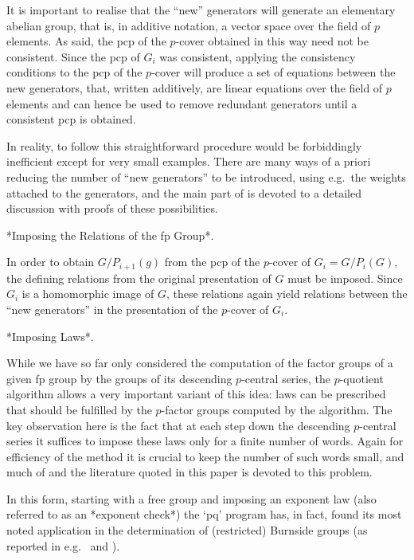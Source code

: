 It is important  to realise  that the  ``new'' generators
will  generate  an elementary  abelian  group,  that  is, in  additive
notation, a vector space over the field of $p$ elements.  As said, the
pcp   of  the   $p$-cover   obtained   in  this   way   need  not   be
consistent.  Since  the pcp  of  $G_i$  was  consistent, applying  the
consistency conditions to the pcp  of the $p$-cover will produce a set
of equations between the new generators, that, written additively, are
linear equations over the field of $p$ elements and can hence be used
to remove redundant generators until a consistent pcp is obtained.

In  reality,  to  follow  this  straightforward   procedure  would  be
forbiddingly inefficient  except for  very small examples.   There are
many ways  of a priori reducing  the number of ``new  generators'' to be
introduced, using e.g.~the weights attached to the generators, and the
main  part of  \cite{NNN98} is  devoted  to a  detailed discussion  with
proofs of these possibilities.

*Imposing the Relations of the fp Group*.

In order  to obtain  $G/P_{i+1}(g)$ from the  pcp of the  $p$-cover of
$G_i   =  G/P_i(G)$,   the  defining   relations  from   the  original
presentation  of $G$  must be  imposed. Since  $G_i$ is  a homomorphic
image of $G$,  these relations again yield relations  between the ``new
generators'' in the presentation of the $p$-cover of $G_i$.

*Imposing Laws*. 

While  we  have  so  far   only  considered  the  computation  of  the
factor groups  of a  given fp  group by  the groups  of  its descending
$p$-central series, the $p$-quotient algorithm allows a very important
variant of this idea: laws  can be prescribed that should be fulfilled
by  the  $p$-factor  groups   computed  by  the  algorithm.   The  key
observation here  is the  fact that at  each step down  the descending
$p$-central series it suffices to  impose these laws only for a finite
number of words.  Again for efficiency  of the method it is crucial to
keep the  number of such words  small, and much of  \cite{NO96} and the
literature quoted in this paper is devoted to this problem.

In this form, starting with a  free group and imposing an exponent law
(also referred  to as an *exponent check*) the `pq' program has,  in fact, found
its  most  noted  application  in the  determination  of  (restricted)
Burnside groups (as reported in e.g.~\cite{HN80} and \cite{NO96}).

